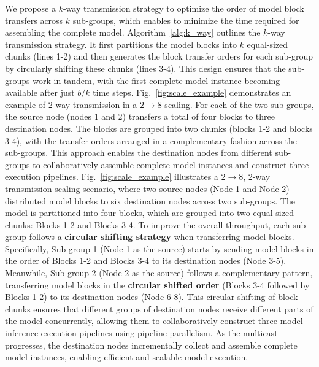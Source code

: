 We propose a $k$-way transmission strategy to optimize the order of model block transfers across $k$ sub-groups, which enables \AlgoName to minimize the time required for assembling the complete model.
Algorithm~\ref{alg:k_way} outlines the $k$-way transmission strategy. 
It first partitions the model blocks into $k$ equal-sized chunks (lines 1-2) and then generates the block transfer orders for each sub-group by circularly shifting these chunks (lines 3-4). 
This design ensures that the sub-groups work in tandem, with the first complete model instance becoming available after just $b/k$ time steps. 
Fig.~\ref{fig:scale_example} demonstrates an example of 2-way transmission in a $2 \rightarrow 8$ scaling.
For each of the two sub-groups, the source node (nodes 1 and 2) transfers a total of four blocks to three destination nodes.
The blocks are grouped into two chunks (blocks 1-2 and blocks 3-4), with the transfer orders arranged in a complementary fashion across the sub-groups. 
This approach enables the destination nodes from different sub-groups to collaboratively assemble complete model instances and construct three execution pipelines. 
\fi 
Fig.~\ref{fig:scale_example} illustrates a $2 \rightarrow 8$, 2-way transmission scaling scenario, where two source nodes (Node 1 and Node 2) distributed model blocks to six destination nodes across two sub-groups. The model is partitioned into four blocks, which are grouped into two equal-sized chunks: Blocks 1-2 and Blocks 3-4. To improve the overall throughput, each sub-group follows a {\bf circular shifting strategy} when transferring model blocks. Specifically, Sub-group 1 (Node 1 as the source) starts by sending model blocks in the order of Blocks 1-2 and Blocks 3-4 to its destination nodes (Node 3-5). Meanwhile, Sub-group 2 (Node 2 as the source) follows a complementary pattern, transferring model blocks in the {\bf circular shifted order} (Blocks 3-4 followed by Blocks 1-2) to its destination nodes (Node 6-8). 
This circular shifting of block chunks ensures that different groups of destination nodes receive different parts of the model concurrently, allowing them to collaboratively construct three model inference execution pipelines using pipeline parallelism. As the multicast progresses, the destination nodes incrementally collect and assemble complete model instances, enabling efficient and scalable model execution. 


